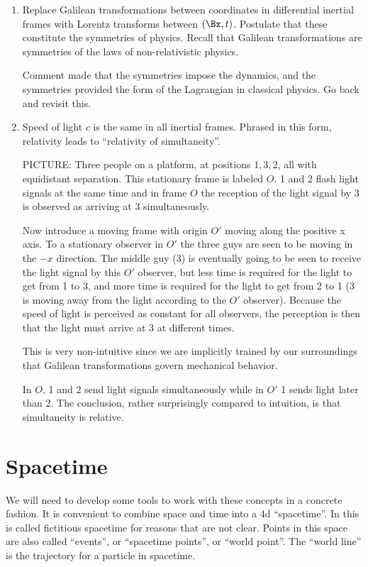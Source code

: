 \begin{enumerate}

\item Replace Galilean transformations between coordinates in differential inertial frames with Lorentz transforms between $(\Bx, t)$.  Postulate that these constitute the symmetries of physics.  Recall that Galilean transformations are symmetries of the laws of non-relativistic physics.  

Comment made that the symmetries impose the dynamics, and the symmetries provided the form of the Lagrangian in classical physics.  Go back and revisit this.

\item Speed of light $c$ is the same in all inertial frames.  Phrased in this form, relativity leads to ``relativity of simultaneity''.

PICTURE: Three people on a platform, at positions $1,3,2$, all with equidistant separation.  This stationary frame is labeled $O$.  1 and 2 flash light signals at the same time and in frame $O$ the reception of the light signal by 3 is observed as arriving at 3 simultaneously.

Now introduce a moving frame with origin $O'$ moving along the positive x axis.  To a stationary observer in $O'$ the three guys are seen to be moving in the $-x$ direction.  The middle guy (3) is eventually going to be seen to receive the light signal by this $O'$ observer, but less time is required for the light to get from 1 to 3, and more time is required for the light to get from 2 to 1 (3 is moving away from the light according to the $O'$ observer).  Because the speed of light is perceived as constant for all observers, the perception is then that the light must arrive at 3 at different times.

This is very non-intuitive since we are implicitly trained by our surroundings that Galilean transformations govern mechanical behavior.

In $O$, 1 and 2 send light signals simultaneously while in $O'$ 1 sends light later than 2.  The conclusion, rather surprisingly compared to intuition, is that simultaneity is relative.

\end{enumerate}

\section{Spacetime}

We will need to develop some tools to work with these concepts in a concrete fashion.  It is convenient to combine space  and time  into a 4d ``spacetime''.  In \cite{landau1980classical} this is called fictitious spacetime for reasons that are not clear.  Points in this space are also called ``events'', or ``spacetime points'', or ``world point''.  The ``world line'' is the trajectory for a particle in spacetime.

